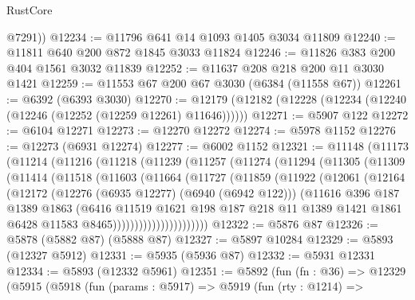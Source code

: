 \begin{lexlean}{RustCore}
\begin{coremodule}
        @7291))
@12234 := @11796 @641 @14 @1093 @1405 @3034 @11809
@12240 := @11811 @640 @200 @872 @1845 @3033 @11824
@12246 := @11826 @383 @200 @404 @1561 @3032 @11839
@12252 := @11637 @208 @218 @200 @11 @3030 @1421
@12259 := @11553 @67 @200 @67 @3030 (@6384 (@11558 @67))
@12261 := @6392 (@6393 @3030)
@12270 := @12179 (@12182 (@12228 (@12234 (@12240 (@12246 (@12252 (@12259 @12261) @11646))))))
@12271 := @5907 @122
@12272 := @6104 @12271
@12273 := @12270 @12272
@12274 := @5978 @1152
@12276 := @12273 (@6931 @12274)
@12277 := @6002 @1152
@12321 := @11148
    (@11173
      (@11214
        (@11216
          (@11218
            (@11239
              (@11257
                (@11274
                  (@11294
                    (@11305
                      (@11309
                        (@11414
                          (@11518
                            (@11603
                              (@11664
                                (@11727
                                  (@11859
                                    (@11922
                                      (@12061
                                        (@12164
                                          (@12172
                                            (@12276 (@6935 @12277) (@6940 (@6942 @122)))
                                            (@11616
                                              @396
                                              @187
                                              @1389
                                              @1863
                                              (@6416
                                                @11519
                                                @1621
                                                @198
                                                @187
                                                @218
                                                @11
                                                @1389
                                                @1421
                                                @1861
                                                @6428
                                                @11583
                                                @8465))))))))))))))))))))))
@12322 := @5876 @87
@12326 := @5878 (@5882 @87) (@5888 @87)
@12327 := @5897 @10284
@12329 := @5893 (@12327 @5912)
@12331 := @5935 (@5936 @87)
@12332 := @5931 @12331
@12334 := @5893 (@12332 @5961)
@12351 := @5892
    (fun (fn : @36) =>
    @12329
      (@5915
        (@5918
          (fun (params : @5917) =>
          @5919
            (fun (rty : @1214) =>

\end{coremodule}
\end{lexlean}
